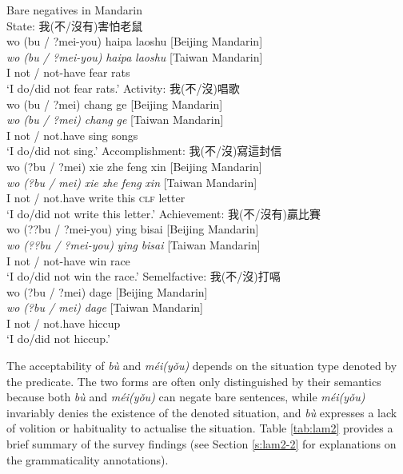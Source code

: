 \documentclass[output=paper]{langscibook}
\begin{document}
\ea Bare negatives in Mandarin \label{ex:lam12}\\
  \ea State: 我(不/沒有)害怕老鼠 \label{ex:lam12a}\\
  	\glll wo	{(bu / ?mei-you)}	haipa	laoshu	{[Beijing Mandarin]} \\
	\textit{wo} \textit{(bu / ?mei-you)}	\textit{haipa} \textit{laoshu} {[Taiwan Mandarin]}\\
	I {not / not-have} fear rats\\
	\glt `I do/did not fear rats.'
  \ex Activity: 我(不/沒)唱歌 \label{ex:lam12b}\\
  	\glll wo	{(bu / ?mei)}	chang	ge	{[Beijing Mandarin]}\\
	  \textit{wo}	\textit{(bu / ?mei)} \textit{chang} \textit{ge} {[Taiwan Mandarin]}\\
	I {not / not.have} sing songs\\
	\glt `I do/did not sing.'
  \ex Accomplishment: 我(不/沒)寫這封信 \label{ex:lam12c}\\
	\glll wo	 {(?bu / ?mei)} xie zhe feng xin {[Beijing Mandarin]}\\
	\textit{wo} \textit{(?bu / mei)} \textit{xie} \textit{zhe} \textit{feng} \textit{xin} {[Taiwan Mandarin]}\\
	I {not / not.have} write this \textsc{clf} letter\\
	\glt `I do/did not write this letter.'
  \ex Achievement: 我(不/沒有)贏比賽 \label{ex:lam12d}\\
  	\glll wo	 {(??bu / ?mei-you)} ying bisai {[Beijing Mandarin]}\\
  	\textit{wo} \textit{(??bu / ?mei-you)} \textit{ying} \textit{bisai} {[Taiwan Mandarin]}\\
  	I {not / not-have} win race\\
  	\glt `I do/did not win the race.'
  \ex Semelfactive: 我(不/沒)打嗝 \label{ex:lam12e}\\
	\glll wo {(?bu / ?mei)} dage {[Beijing Mandarin]}\\
	\textit{wo} \textit{(?bu / mei)} \textit{dage} {[Taiwan Mandarin]}\\
	I {not / not.have} hiccup\\
	\glt `I do/did not hiccup.'
\z \z 

The acceptability of \textit{bù} and \textit{méi(yǒu)} depends on the situation type denoted by the predicate. The two forms are often only distinguished by their semantics because both \textit{bù} and \textit{méi(yǒu)} can negate bare sentences, while \textit{méi(yǒu)} invariably denies the existence of the denoted situation, and \textit{bù} expresses a lack of volition or habituality to actualise the situation. Table \ref{tab:lam2} provides a brief summary of the survey findings (see Section \ref{s:lam2-2} for explanations on the grammaticality annotations).
\end{document}
